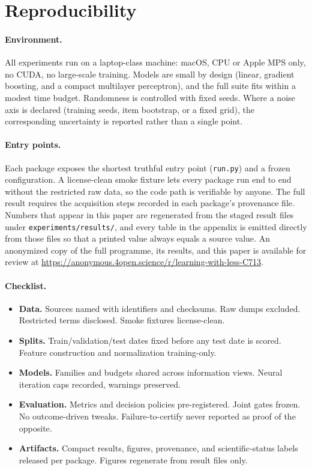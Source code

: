 \section{Reproducibility}
\label{app:repro}

\paragraph{Environment.} All experiments run on a laptop-class machine: macOS, CPU or Apple
MPS only, no CUDA, no large-scale training. Models are small by design (linear, gradient
boosting, and a compact multilayer perceptron), and the full suite fits within a modest time
budget. Randomness is controlled with fixed seeds. Where a noise axis is declared (training
seeds, item bootstrap, or a fixed grid), the corresponding uncertainty is reported rather
than a single point.

\paragraph{Entry points.} Each package exposes the shortest truthful entry point (\texttt{run.py})
and a frozen configuration. A license-clean smoke fixture lets every package run end to end
without the restricted raw data, so the code path is verifiable by anyone. The full result
requires the acquisition steps recorded in each package's provenance file. Numbers that appear
in this paper are regenerated from the staged result files under
\texttt{experiments/results/}, and every table in the appendix is emitted directly from those
files so that a printed value always equals a source value. An anonymized copy of the full
programme, its results, and this paper is available for review at
\url{https://anonymous.4open.science/r/learning-with-less-C713}.

\paragraph{Checklist.}
\begin{itemize}[leftmargin=1.4em]
\item \textbf{Data.} Sources named with identifiers and checksums. Raw dumps excluded. Restricted terms disclosed. Smoke fixtures license-clean.
\item \textbf{Splits.} Train/validation/test dates fixed before any test date is scored. Feature construction and normalization training-only.
\item \textbf{Models.} Families and budgets shared across information views. Neural
 iteration caps recorded, warnings preserved.
\item \textbf{Evaluation.} Metrics and decision policies pre-registered. Joint gates frozen. No outcome-driven tweaks. Failure-to-certify never reported as proof of the opposite.
\item \textbf{Artifacts.} Compact results, figures, provenance, and scientific-status labels
 released per package. Figures regenerate from result files only.
\end{itemize}

